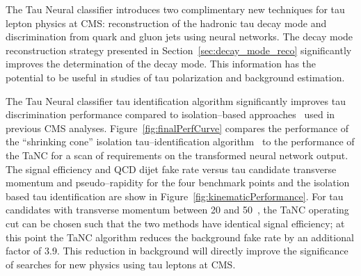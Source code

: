 The Tau Neural classifier introduces two complimentary new techniques for tau
lepton physics at CMS: reconstruction of the hadronic tau decay mode and
discrimination from quark and gluon jets using neural networks.  The decay mode
reconstruction strategy presented in Section~\ref{sec:decay_mode_reco}
significantly improves the determination of the decay mode. This information has
the potential to be useful in studies of tau polarization and background
estimation.

The Tau Neural classifier tau identification algorithm significantly improves
tau discrimination performance compared to isolation--based
approaches~\cite{CMS-PAS-PFT-08-001} used in previous CMS analyses.
Figure~\ref{fig:finalPerfCurve} compares the performance of the ``shrinking
cone'' isolation tau--identification algorithm~\cite{CMS-PAS-PFT-08-001} to the
performance of the TaNC for a scan of requirements on the transformed neural
network output.  The signal efficiency and QCD dijet fake rate versus
tau candidate transverse momentum and pseudo--rapidity for the four benchmark
points and the isolation based tau identification are show in
Figure~\ref{fig:kinematicPerformance}.  For tau candidates with transverse
momentum between 20 and 50~\GeVc, the TaNC operating cut can be chosen such that
the two methods have identical signal efficiency; at this point the TaNC
algorithm reduces the background fake rate by an additional factor of 3.9.  This
reduction in background will directly improve the significance of searches for
new physics using tau leptons at CMS.

